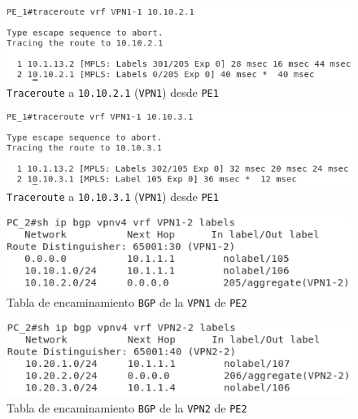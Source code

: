 \documentclass[11pt]{article}
\begin{document}
            \begin{figure}
                \centering
                \includegraphics[width=0.6\linewidth]{trace_10.10.2.1_PE_1.png}
                \caption{\texttt{Traceroute} a \texttt{10.10.2.1} (\texttt{VPN1}) desde \texttt{PE1}}
                \label{fig:trace_10.10.2.1_PE_1}
            \end{figure}

            \begin{figure}
                \centering
                \includegraphics[width=0.6\linewidth]{trace_10.10.3.1_PE_1.png}
                \caption{\texttt{Traceroute} a \texttt{10.10.3.1} (\texttt{VPN1}) desde \texttt{PE1}}
                \label{fig:trace_10.10.3.1_PE_1}
            \end{figure}

            \begin{figure}
                \centering
                \includegraphics[width=0.6\linewidth]{ip_bgp_VPN1_PE_2.png}
                \caption{Tabla de encaminamiento \texttt{BGP} de la \texttt{VPN1} de \texttt{PE2}}
                \label{fig:ip_bgp_VPN1_PE_2}
            \end{figure}

            \begin{figure}
                \centering
                \includegraphics[width=0.6\linewidth]{ip_bgp_VPN2_PE_2.png}
                \caption{Tabla de encaminamiento \texttt{BGP} de la \texttt{VPN2} de \texttt{PE2}}
                \label{fig:ip_bgp_VPN2_PE_2}
            \end{figure}
\end{document}

